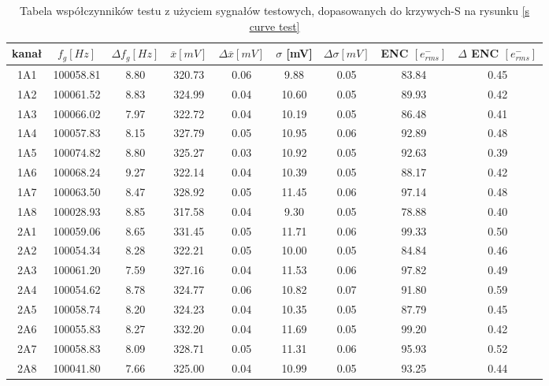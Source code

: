 \begin{appendices}
\begin{table}
\begin{multicols}{3}
    \end{multicols}

\end{table}


\begin{table}
    \caption{Tabela współczynników testu z użyciem sygnałów testowych, dopasowanych do krzywych-S na rysunku \ref{s curve test}}
    \label{tabela wsp test}
    \begin{adjustbox}{width=1.1\linewidth,center}
    \begin{tabular}{|c|c|c|c|c|c|c|c|c|}
            \hline
            kanał & $f_g [Hz]$&$\Delta f_g [Hz]$&$\overline{x} [mV]$&$\Delta \overline{x} [mV]$&  $\sigma$ [mV]&  $\Delta \sigma [mV]$ & ENC $[e^-_{rms}]$& $\Delta$ ENC $[e^-_{rms}]$\\ \hline

                    1A1&100058.81&8.80&320.73&0.06&9.88&0.05&83.84&0.45 \\ \hline 
                    1A2&100061.52&8.83&324.99&0.04&10.60&0.05&89.93&0.42 \\ \hline 
                    1A3&100066.02&7.97&322.72&0.04&10.19&0.05&86.48&0.41 \\ \hline 
                    1A4&100057.83&8.15&327.79&0.05&10.95&0.06&92.89&0.48 \\ \hline 
                    1A5&100074.82&8.80&325.27&0.03&10.92&0.05&92.63&0.39 \\ \hline 
                    1A6&100068.24&9.27&322.14&0.04&10.39&0.05&88.17&0.42 \\ \hline 
                    1A7&100063.50&8.47&328.92&0.05&11.45&0.06&97.14&0.48 \\ \hline 
                    1A8&100028.93&8.85&317.58&0.04&9.30&0.05&78.88&0.40 \\ \hline 
                    2A1&100059.06&8.65&331.45&0.05&11.71&0.06&99.33&0.50 \\ \hline 
                    2A2&100054.34&8.28&322.21&0.05&10.00&0.05&84.84&0.46 \\ \hline 
                    2A3&100061.20&7.59&327.16&0.04&11.53&0.06&97.82&0.49 \\ \hline 
                    2A4&100054.62&8.78&324.77&0.06&10.82&0.07&91.80&0.59 \\ \hline 
                    2A5&100058.74&8.20&324.23&0.04&10.35&0.05&87.79&0.45 \\ \hline 
                    2A6&100055.83&8.27&332.20&0.04&11.69&0.05&99.20&0.42 \\ \hline 
                    2A7&100058.83&8.09&328.71&0.05&11.31&0.06&95.93&0.52 \\ \hline 
                    2A8&100041.80&7.66&325.00&0.04&10.99&0.05&93.25&0.44 \\ \hline                    
    \end{tabular}
    \end{adjustbox} 
\end{table}


\end{appendices}
